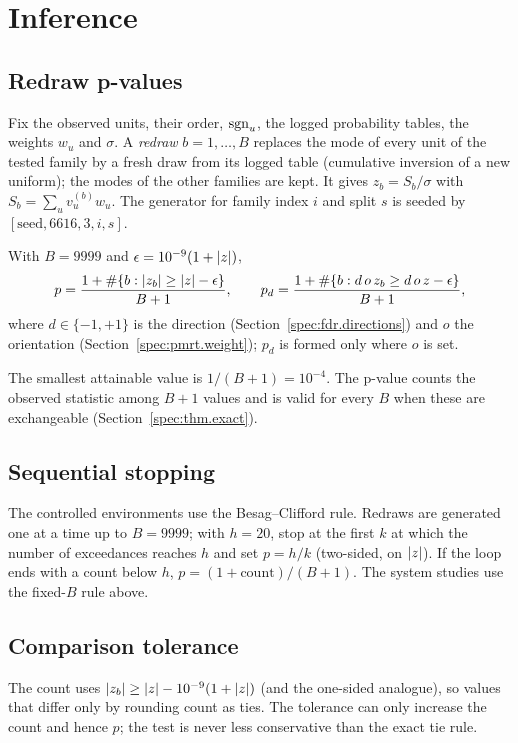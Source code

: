 \section{Inference}
\label{spec:inf}

\subsection{Redraw p-values}
\label{spec:inf.pval}

Fix the observed units, their order, $\mathrm{sgn}_u$, the logged probability tables, the weights $w_u$ and $\sigma$. A \emph{redraw} $b = 1, \dots, B$ replaces the mode of every unit of the tested family by a fresh draw from its logged table (cumulative inversion of a new uniform); the modes of the other families are kept. It gives $z_b = S_b/\sigma$ with $S_b = \sum_u v_u^{(b)} w_u$. The generator for family index $i$ and split $s$ is seeded by $[\text{seed}, 6616, 3, i, s]$.

\begin{definition}
With $B = 9999$ and $\epsilon = 10^{-9}(1 + \lvert z\rvert)$,
\begin{equation*}
p = \frac{1 + \#\{b : \lvert z_b\rvert \ge \lvert z\rvert - \epsilon\}}{B + 1}, \qquad
p_d = \frac{1 + \#\{b : d\, o\, z_b \ge d\, o\, z - \epsilon\}}{B + 1},
\end{equation*}
where $d \in \{-1, +1\}$ is the direction (Section~\ref{spec:fdr.directions}) and $o$ the orientation (Section~\ref{spec:pmrt.weight}); $p_d$ is formed only where $o$ is set.
\end{definition}

\noindent The smallest attainable value is $1/(B+1) = 10^{-4}$. The p-value counts the observed statistic among $B+1$ values and is valid for every $B$ when these are exchangeable (Section~\ref{spec:thm.exact}).


\subsection{Sequential stopping}
\label{spec:inf.bc}

The controlled environments use the Besag--Clifford rule. Redraws are generated one at a time up to $B = 9999$; with $h = 20$, stop at the first $k$ at which the number of exceedances reaches $h$ and set $p = h/k$ (two-sided, on $\lvert z\rvert$). If the loop ends with a count below $h$, $p = (1 + \text{count})/(B + 1)$. The system studies use the fixed-$B$ rule above.

\subsection{Comparison tolerance}
\label{spec:inf.tolerance}

The count uses $\lvert z_b\rvert \ge \lvert z\rvert - 10^{-9}(1 + \lvert z\rvert)$ (and the one-sided analogue), so values that differ only by rounding count as ties. The tolerance can only increase the count and hence $p$; the test is never less conservative than the exact tie rule.
